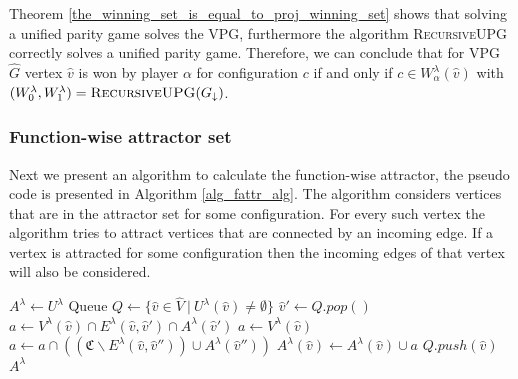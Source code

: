 Theorem \ref{the_winning_set_is_equal_to_proj_winning_set} shows that solving a unified parity game solves the VPG, furthermore the algorithm \textsc{RecursiveUPG} correctly solves a unified parity game. Therefore, we can conclude that for VPG $\hat{G}$ vertex $\hat{v}$ is won by player $\alpha$ for configuration $c$ if and only if $c \in W_\alpha^\lambda(\hat{v})$ with $(W^\lambda_0,W^\lambda_1) = \textsc{RecursiveUPG}(G_{\downarrow})$.

\subsubsection{Function-wise attractor set}
Next we present an algorithm to calculate the function-wise attractor, the pseudo code is presented in Algorithm \ref{alg_fattr_alg}. The algorithm considers vertices that are in the attractor set for some configuration. For every such vertex the algorithm tries to attract vertices that are connected by an incoming edge. If a vertex is attracted for some configuration then the incoming edges of that vertex will also be considered.
\begin{algorithm}
	\caption{$\textsc{$\alpha$-FAttractor}(G, U^\lambda : \hat{V} \rightarrow 2^\mathfrak{C})$}\label{alg_fattr_alg}
	\begin{algorithmic}[1]
		\State $A^\lambda \gets U^\lambda$
		\State Queue $Q \gets \{\hat{v} \in \hat{V} \ |\ U^\lambda(\hat{v}) \neq \emptyset  \}$
		\label{line:fattr:while}
		\State $\hat{v}' \gets Q.pop()$\label{line:fattr:pop}
		\label{line:fattr:firstfor}
			\label{line:fattr:if_owner_alpha}
				\State $a \gets V^\lambda(\hat{v}) \cap E^\lambda(\hat{v},\hat{v}') \cap A^\lambda(\hat{v}')$\label{line:fattr:attract_owner_alpha}
			\Else
				\State $a \gets V^\lambda(\hat{v})$\label{line:fattr:attract_owner_not_alpha_start}
					\State $a \gets a \cap ((\mathfrak{C}\backslash E^\lambda(\hat{v},\hat{v}'')) \cup A^\lambda(\hat{v}''))$
				\EndFor\label{line:fattr:attract_owner_not_alpha_end}
			\EndIf\label{line:fattr:if_owner_alpha_end}
			\label{line:fattr:if_something_attracted}
				\State $A^\lambda(\hat{v}) \gets A^\lambda(\hat{v}) \cup a$\label{line:fattr:add_to_A}
				\State $Q.push(\hat{v})$\label{line:fattr:add_to_Q}
			\EndIf
		\EndFor
		\EndWhile
		\State \Return $A^\lambda$
	\end{algorithmic}
\end{algorithm}

